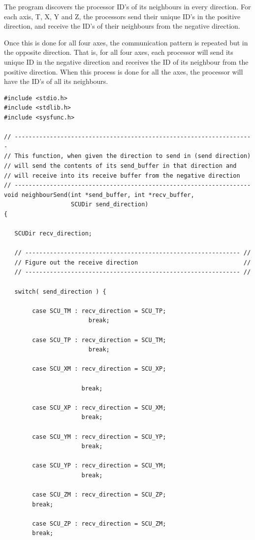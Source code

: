 The program discovers the processor ID's of its neighbours in every direction.
For each axis, T, X, Y and Z, the processors send their unique ID's in the
positive direction, and receive the ID's of their neighbours from the negative
direction.

Once this is done for all four axes, the communication pattern is
repeated but in the opposite direction. That is, for all four axes,
each processor will send its unique ID in the negative direction and
receives the ID of its neighbour from the positive direction.  When
this process is done for all the axes, the processor will have the ID's of
all its neighbours.

{\scriptsize
\begin{verbatim}
#include <stdio.h>
#include <stdlib.h>
#include <sysfunc.h>

// --------------------------------------------------------------------
// This function, when given the direction to send in (send direction)
// will send the contents of its send_buffer in that direction and 
// will receive into its receive buffer from the negative direction
// -------------------------------------------------------------------
void neighbourSend(int *send_buffer, int *recv_buffer,
                   SCUDir send_direction)
{

   SCUDir recv_direction;

   // ------------------------------------------------------------- //
   // Figure out the receive direction                              //
   // ------------------------------------------------------------- //

   switch( send_direction ) {

        case SCU_TM : recv_direction = SCU_TP;
                        break;

        case SCU_TP : recv_direction = SCU_TM;
                        break;

        case SCU_XM : recv_direction = SCU_XP;

                      break;

        case SCU_XP : recv_direction = SCU_XM;
                      break;

        case SCU_YM : recv_direction = SCU_YP;
                      break;

        case SCU_YP : recv_direction = SCU_YM;
                      break;

        case SCU_ZM : recv_direction = SCU_ZP;
        break;

        case SCU_ZP : recv_direction = SCU_ZM;
        break;


\end{verbatim}}
